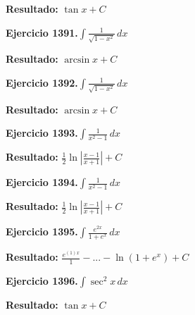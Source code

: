 \documentclass[10pt,a4paper]{article}
\begin{document}
\begin{solbox}
\textbf{Resultado:} \(\displaystyle \tan x + C\)
\end{solbox}

\begin{ejbox}
\textbf{Ejercicio 1391.}\quad $\int \frac{1}{\sqrt{1-x^2}}\,dx$
\end{ejbox}

\begin{solbox}
\textbf{Resultado:} \(\displaystyle \arcsin x + C\)
\end{solbox}

\begin{ejbox}
\textbf{Ejercicio 1392.}\quad $\int \frac{1}{\sqrt{1-x^2}}\,dx$
\end{ejbox}

\begin{solbox}
\textbf{Resultado:} \(\displaystyle \arcsin x + C\)
\end{solbox}

\newpage
\begin{ejbox}
\textbf{Ejercicio 1393.}\quad $\int \frac{1}{x^2-1}\,dx$
\end{ejbox}

\begin{solbox}
\textbf{Resultado:} \(\displaystyle \frac{1}{2}\ln\left|\frac{x-1}{x+1}\right| + C\)
\end{solbox}

\begin{ejbox}
\textbf{Ejercicio 1394.}\quad $\int \frac{1}{x^2-1}\,dx$
\end{ejbox}

\begin{solbox}
\textbf{Resultado:} \(\displaystyle \frac{1}{2}\ln\left|\frac{x-1}{x+1}\right| + C\)
\end{solbox}

\begin{ejbox}
\textbf{Ejercicio 1395.}\quad $\int \frac{e^{2x}}{1+e^{x}}\,dx$
\end{ejbox}

\begin{solbox}
\textbf{Resultado:} \(\displaystyle \frac{e^{(1)x}}{1} - ... - \ln(1+e^x) + C\)
\end{solbox}

\newpage
\begin{ejbox}
\textbf{Ejercicio 1396.}\quad $\int \sec^2 x\,dx$
\end{ejbox}

\begin{solbox}
\textbf{Resultado:} \(\displaystyle \tan x + C\)
\end{solbox}
\end{document}
